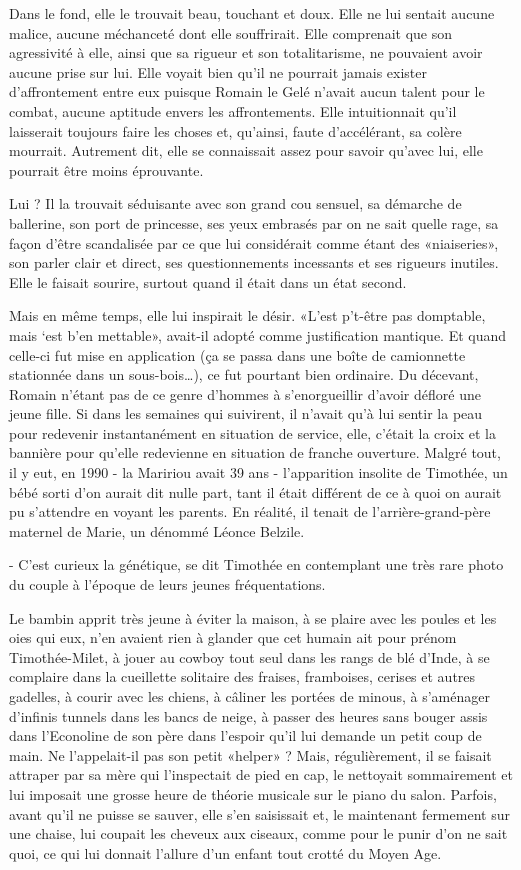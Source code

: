 Dans le fond, elle le trouvait beau, touchant et doux. Elle ne lui sentait aucune malice, aucune méchanceté dont elle souffrirait. Elle comprenait que son agressivité à elle, ainsi que sa rigueur et son totalitarisme, ne pouvaient avoir aucune prise sur lui. Elle voyait bien qu’il ne pourrait jamais exister d’affrontement entre eux puisque Romain le Gelé n’avait aucun talent pour le combat, aucune aptitude envers les affrontements. Elle intuitionnait qu’il laisserait toujours faire les choses et, qu’ainsi, faute d’accélérant, sa colère mourrait. Autrement dit, elle se connaissait assez pour savoir qu’avec lui, elle pourrait être moins éprouvante.

Lui ? Il la trouvait séduisante avec son grand cou sensuel, sa démarche de ballerine, son port de princesse, ses yeux embrasés par on ne sait quelle rage, sa façon d’être scandalisée par ce que lui considérait comme étant des «niaiseries», son parler clair et direct, ses questionnements incessants et ses rigueurs inutiles. Elle le faisait sourire, surtout quand il était dans un état second.

Mais en même temps, elle lui inspirait le désir. «L’est p’t-être pas domptable, mais ‘est b’en mettable», avait-il adopté comme justification mantique. Et quand celle-ci fut mise en application (ça se passa dans une boîte de camionnette stationnée dans un sous-bois…), ce fut pourtant bien ordinaire. Du décevant, Romain n’étant pas de ce genre d’hommes à s’enorgueillir d’avoir défloré une jeune fille. Si dans les semaines qui suivirent, il n’avait qu’à lui sentir la peau pour redevenir instantanément en situation de service, elle, c’était la croix et la bannière pour qu’elle redevienne en situation de franche ouverture. Malgré tout, il y eut, en 1990 - la Maririou avait 39 ans - l’apparition insolite de Timothée, un bébé sorti d’on aurait dit nulle part, tant il était différent de ce à quoi on aurait pu s’attendre en voyant les parents. En réalité, il tenait de l’arrière-grand-père maternel de Marie, un dénommé Léonce Belzile.

- C’est curieux la génétique, se dit Timothée en contemplant une très rare photo du couple à l’époque de leurs jeunes fréquentations.

Le bambin apprit très jeune à éviter la maison, à se plaire avec les poules et les oies qui eux, n’en avaient rien à glander que cet humain ait pour prénom Timothée-Milet, à jouer au cowboy tout seul dans les rangs de blé d’Inde, à se complaire dans la cueillette solitaire des fraises, framboises, cerises et autres gadelles, à courir avec les chiens, à câliner les portées de minous, à s’aménager d’infinis tunnels dans les bancs de neige, à passer des heures sans bouger assis dans l’Econoline de son père dans l’espoir qu’il lui demande un petit coup de main. Ne l’appelait-il pas son petit «helper» ? Mais, régulièrement, il se faisait attraper par sa mère qui l’inspectait de pied en cap, le nettoyait sommairement et lui imposait une grosse heure de théorie musicale sur le piano du salon. Parfois, avant qu’il ne puisse se sauver, elle s’en saisissait et, le maintenant fermement sur une chaise, lui coupait les cheveux aux ciseaux, comme pour le punir d’on ne sait quoi, ce qui lui donnait l’allure d’un enfant tout crotté du Moyen Age.

